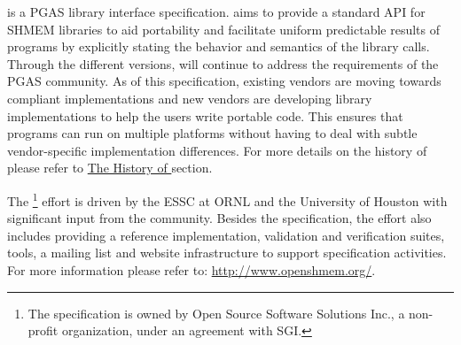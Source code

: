 \openshmem is a \ac{PGAS} library interface specification. \openshmem aims to
provide a standard \ac{API} for SHMEM libraries to aid portability and
facilitate uniform predictable results of \openshmem programs by explicitly
stating the behavior and semantics of the \openshmem library calls. Through the
different versions, \openshmem will continue to address the requirements of the
\ac{PGAS} community.  As of this specification, existing vendors are moving
towards \openshmem compliant implementations and new vendors are developing
\openshmem library implementations to help the users write portable \openshmem
code. This ensures that programs can run on multiple platforms without having to
deal with subtle vendor-specific implementation differences. For more details on
the history of \openshmem please refer to \hyperref[sec:openshmem_history]{The
History of \openshmem} section.  

The \openshmem\footnote{The \openshmem specification is owned by Open Source
Software Solutions Inc., a non-profit organization, under an agreement with
SGI.}  effort is driven by the \ac{ESSC} at \ac{ORNL} and the University of
Houston with significant input from the \openshmem community. Besides the
specification, the effort also includes providing a reference \openshmem
implementation, validation and verification suites, tools, a mailing list and
website infrastructure to support specification activities. For more information
please refer to: \url{http://www.openshmem.org/}.
